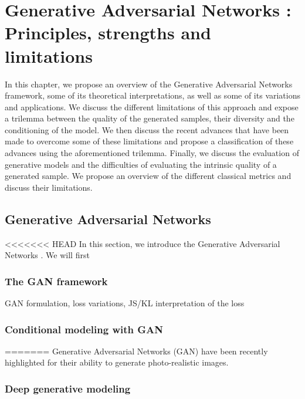 \chapter{Generative Adversarial Networks : Principles, strengths and limitations}
\label{chap:chapter1}

\begin{chapterabstract}
	In this chapter, we propose an overview	 of the Generative Adversarial Networks \cite{Goodfellow2014} framework, some of its theoretical interpretations, as well as some of its variations and applications. We discuss the different limitations of this approach and expose a trilemma between the quality of the generated samples, their diversity and the conditioning of the model. We then discuss the recent advances that have been made to overcome some of these limitations and propose a classification of these advances using the aforementioned trilemma. Finally, we discuss the evaluation of generative models and the difficulties of evaluating the intrinsic quality of a generated sample.  We propose an overview of the different classical metrics and discuss their limitations.
\end{chapterabstract}

\minitoc

\section{Generative Adversarial Networks}

<<<<<<< HEAD
In this section, we introduce the Generative Adversarial Networks \cite{Goodfellow2014}.  We will first 

\subsection{The GAN framework}

GAN formulation, loss variations, JS/KL interpretation of the loss

\subsection{Conditional modeling with  \ac{GAN}}
=======
Generative Adversarial Networks (\ac{GAN}) \cite{Goodfellow2014} have been recently highlighted for their ability to generate photo-realistic images.

\subsection{Deep generative modeling}

